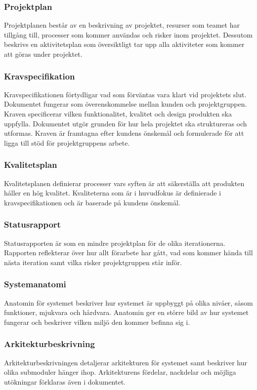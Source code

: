 \subsubsection*{Projektplan}
Projektplanen består av en beskrivning av projektet, resurser som teamet har tillgång till, processer som kommer användas och risker inom projektet. Dessutom beskrivs en aktivitetsplan som översiktligt tar upp alla aktiviteter som kommer att
göras under projektet.

\subsubsection*{Kravspecifikation}
Kravspecifikationen förtydligar vad som förväntas vara klart vid projektets slut. Dokumentet fungerar som överenskommelse mellan kunden och projektgruppen. Kraven specificerar vilken funktionalitet, kvalitet och design produkten ska uppfylla. Dokumentet utgör grunden för hur hela projektet ska struktureras och utformas. Kraven är framtagna efter kundens önskemål och formulerade för att ligga till stöd för projektgruppens arbete.

\subsubsection*{Kvalitetsplan}
Kvalitetsplanen definierar processer vars syften är att säkerställa att produkten håller en hög kvalitet. Kvaliteterna som är i huvudfokus är definierade i kravspecifikationen och är baserade på kundens önskemål.

\subsubsection*{Statusrapport}
Statusrapporten är som en mindre projektplan för
de olika iterationerna. Rapporten reflekterar över hur allt förarbete har gått, vad som kommer
hända till nästa iteration samt vilka risker projektgruppen står inför.

\subsubsection*{Systemanatomi}
Anatomin för systemet beskriver hur systemet är uppbyggt på olika nivåer, såsom funktioner, mjukvara och hårdvara. Anatomin ger en större bild av hur systemet fungerar och beskriver vilken miljö den kommer befinna sig i.

\subsubsection*{Arkitekturbeskrivning}
Arkitekturbeskrivningen detaljerar arkitekturen för systemet samt beskriver hur olika submoduler hänger ihop. Arkitekturens fördelar, nackdelar och möjliga utökningar förklaras även i dokumentet.

